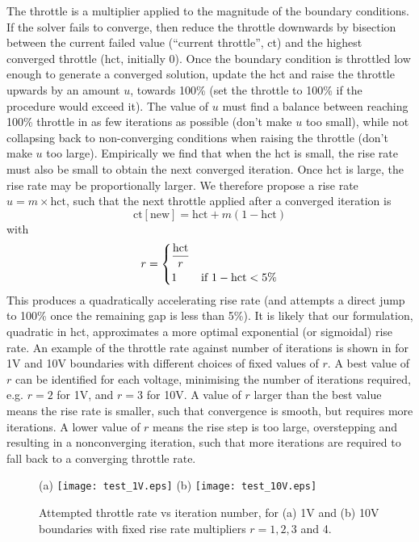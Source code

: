 The throttle is a multiplier
applied to the magnitude of the boundary conditions.
If the solver fails to converge, then reduce the throttle downwards by
bisection between the current failed value (``current throttle'', ct) and the highest converged
throttle (hct, initially 0). Once the boundary
condition is throttled low enough to generate a converged solution,
update the hct and raise
the throttle upwards by an amount $u$, towards 100\% (set the throttle
to 100\% if the procedure would exceed it).  The value of $u$
must find a balance between reaching 100\% throttle in as few
iterations as possible (don't make $u$ too small), while not collapsing back to non-converging
conditions when raising the throttle (don't make $u$ too
large). Empirically we find that when the hct is small, the rise rate
must also be small to obtain the next converged iteration. Once hct is
large, the rise rate may be proportionally larger. We therefore
propose a rise rate $u=m\times \mathrm{hct}$, such that the next
throttle applied after a converged iteration is
\begin{equation}
  \mathrm{ct [new]} = \mathrm{hct} + m (1-\mathrm{hct})
\end{equation}
with
\begin{equation}
  r=
  \begin{dcases}
    \frac{\mathrm{hct}}{r} & \\
    1 & \text{if } 1-\mathrm{hct} < 5\%
  \end{dcases}
\end{equation}
This produces a quadratically accelerating rise rate (and attempts a
direct jump to 100\% once the remaining gap is less than 5\%).  It is likely
that our formulation, quadratic in hct, approximates a more 
optimal exponential (or
sigmoidal) rise rate.
An example of
the  throttle rate against number of iterations is shown in
 for 1V and 10V boundaries with different
choices of fixed values of $r$. A best value of $r$ can be identified
for each voltage, minimising the number of iterations required,
e.g. $r=2$ for 1V, and $r=3$ for 10V. A
value of $r$ larger than the best value means the rise rate is
smaller, such that convergence is smooth, but requires more
iterations. A lower value of $r$ means the rise step is too large,
overstepping and resulting in a nonconverging iteration, such that
more iterations are required to fall back to a converging throttle rate.

\begin{figure}
\centering
(a)
\texttt{[image: test\_1V.eps]}
(b)
\texttt{[image: test\_10V.eps]}
\caption{Attempted throttle rate vs iteration number, for (a) 1V and
  (b) 10V  boundaries with fixed rise rate multipliers $r=1,2,3$ and 4.
}
\label{fig:throttle_rate}
\end{figure}

